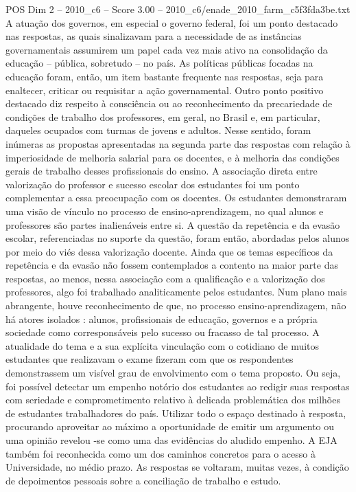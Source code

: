 \begin{textsample}{POS Dim 2 – 2010\_c6 – Score 3.00 – 2010\_c6/enade\_2010\_farm\_c5f3fda3be.txt}
A atuação dos governos, em especial o governo federal, foi um ponto destacado nas respostas, as quais sinalizavam para a necessidade de as instâncias governamentais assumirem um papel cada vez mais ativo na consolidação da educação – pública, sobretudo – no país.
As políticas públicas focadas na educação foram, então, um item bastante frequente nas respostas, seja para enaltecer, criticar ou requisitar a ação governamental.
Outro ponto positivo destacado diz respeito à consciência ou ao reconhecimento da precariedade de condições de trabalho dos professores, em geral, no Brasil e, em particular, daqueles ocupados com turmas de jovens e adultos.
Nesse sentido, foram inúmeras as propostas apresentadas na segunda parte das respostas com relação à imperiosidade de melhoria salarial para os docentes, e à melhoria das condições gerais de trabalho desses profissionais do ensino.
A associação direta entre valorização do professor e sucesso escolar dos estudantes foi um ponto complementar a essa preocupação com os docentes.
Os estudantes demonstraram uma visão de vínculo no processo de ensino-aprendizagem, no qual alunos e professores são partes inalienáveis entre si.
A questão da repetência e da evasão escolar, referenciadas no suporte da questão, foram então, abordadas pelos alunos por meio do viés dessa valorização docente.
Ainda que os temas específicos da repetência e da evasão não fossem contemplados a contento na maior parte das respostas, ao menos, nessa associação com a qualificação e a valorização dos professores, algo foi trabalhado analiticamente pelos estudantes.
Num plano mais abrangente, houve reconhecimento de que, no processo ensino-aprendizagem, não há atores isolados : alunos, profissionais de educação, governos e a própria sociedade como corresponsáveis pelo sucesso ou fracasso de tal processo.
A atualidade do tema e a sua explícita vinculação com o cotidiano de muitos estudantes que realizavam o exame fizeram com que os respondentes demonstrassem um visível grau de envolvimento com o tema proposto.
Ou seja, foi possível detectar um empenho notório dos estudantes ao redigir suas respostas com seriedade e comprometimento relativo à delicada problemática dos milhões de estudantes trabalhadores do país.
Utilizar todo o espaço destinado à resposta, procurando aproveitar ao máximo a oportunidade de emitir um argumento ou uma opinião revelou -se como uma das evidências do aludido empenho.
A EJA também foi reconhecida como um dos caminhos concretos para o acesso à Universidade, no médio prazo.
As respostas se voltaram, muitas vezes, à condição de depoimentos pessoais sobre a conciliação de trabalho e estudo.

\end{textsample}
